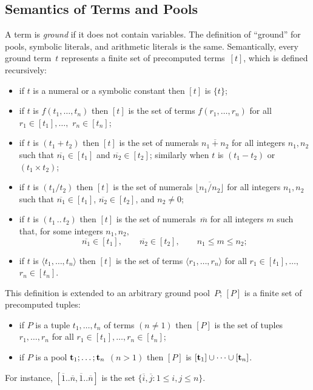 \documentclass{tlp}
\begin{document}
\subsection{Semantics of Terms and Pools}

A term is {\sl ground} if it does not contain variables. The definition of
``ground'' for pools, symbolic literals, and arithmetic literals is the same.
Semantically, every ground term~$t$  represents a finite 
set of precomputed terms~$[t]$, which is defined recursively:  
\begin{itemize}
\item if $t$ is a numeral or a symbolic constant then $[t]$ is 
$\{t\}$;
\item if $t$ is $f(t_1, \dots, t_n)$  then $[t]$ is the set of 
terms $f(r_1, \dots, r_n)$ for all 
$r_1 \in [t_1], \dots,$ $r_n \in [t_n]$; 
\item if $t$ is $(t_1 + t_2)$ then $[t]$ is the set  
of numerals $\overline {n_1 + n_2}$ for all integers $n_1, n_2$ such that 
$\overline {n_1} \in [t_1]$ and $\overline {n_2} \in [t_2]$; similarly when $t$ is 
$(t_1 - t_2)$ or $(t_1 \times t_2)$;
\item if $t$ is $(t_1 / t_2)$ then $[t]$ is the set  
of numerals $\overline{\lfloor n_1/n_2 \rfloor}$ for all
integers $n_1, n_2$ such that 
$\overline {n_1} \in [t_1]$, $\overline {n_2} \in [t_2]$, and $n_2\neq 0$;
\item if $t$ is $(t_1\, ..\, t_2)$ then $[t]$ is the set of 
numerals~$\overline m$ for all integers $m$ such that,
for some integers $n_1, n_2,$  
$$ \overline{n_1} \in [t_1], \qquad \overline{n_2} \in [t_2], \qquad 
n_1 \leq m \leq n_2;$$
\item if $t$ is $\langle t_1, \dots, t_n\rangle$ 
then $[t]$ is the set of terms
$\langle r_1, \dots, r_n \rangle$ for all $r_1 \in [t_1],\dots,$ $r_n \in [t_n]$.
\end{itemize}
This definition is extended to an arbitrary ground pool~$P$; $[P]$ 
is a finite set of precomputed tuples:
\begin{itemize}
\item if $P$ is a tuple $t_1, \dots, t_n$ of terms $(n \not = 1)$
then $[P]$ is the set of tuples $r_1, \dots, r_n$ for all 
\hbox{$r_1 \in [t_1], \dots, r_n \in [t_n]$}; 
\item if $P$ is a pool ${\bf t}_1; \dots; {\bf t}_n$ $(n > 1)$ then 
$[P]$ is $[{\bf t}_1] \cup \dots \cup [{\bf t}_n]$.
\end{itemize}

For instance, $[\overline 1..\overline n,\overline 1..\overline n]$ is the set
$\{\overline i , \overline j : 1 \leq i,j \leq n \}$. 
\end{document}

